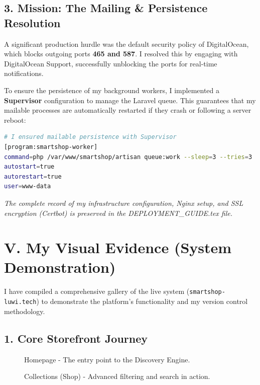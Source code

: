 \documentclass[12pt,a4paper]{article}
\begin{document}
\subsection{3. Mission: The Mailing & Persistence Resolution}
A significant production hurdle was the default security policy of DigitalOcean, which blocks outgoing ports \textbf{465 and 587}. I resolved this by engaging with DigitalOcean Support, successfully unblocking the ports for real-time notifications. 

To ensure the persistence of my background workers, I implemented a \textbf{Supervisor} configuration to manage the Laravel queue. This guarantees that my mailable processes are automatically restarted if they crash or following a server reboot:
\begin{lstlisting}[language=bash]
# I ensured mailable persistence with Supervisor
[program:smartshop-worker]
command=php /var/www/smartshop/artisan queue:work --sleep=3 --tries=3
autostart=true
autorestart=true
user=www-data
\end{lstlisting}

\vfill
\begin{center}
    \textit{The complete record of my infrastructure configuration, Nginx setup, and SSL encryption (Certbot) is preserved in the DEPLOYMENT\_GUIDE.tex file.}
\end{center}

\newpage
\section{V. My Visual Evidence (System Demonstration)}

I have compiled a comprehensive gallery of the live system (\texttt{smartshop-luwi.tech}) to demonstrate the platform’s functionality and my version control methodology.

\subsection{1. Core Storefront Journey}
\begin{figure}[H]
    \centering
    \caption{Homepage - The entry point to the Discovery Engine.}
\end{figure}

\begin{figure}[H]
    \centering
    \caption{Collections (Shop) - Advanced filtering and search in action.}
\end{figure}
\end{document}
